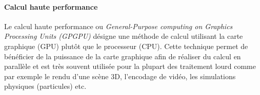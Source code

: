 \paragraph{Calcul haute performance}
Le calcul haute performance ou \emph{General-Purpose computing on Graphics Processing Units (GPGPU)} désigne une méthode de calcul utilisant la carte graphique (GPU) plutôt que le processeur (CPU). Cette technique permet de bénéficier de la puissance de la carte graphique afin de réaliser du calcul en parallèle et est très souvent utilisée pour la plupart des traitement lourd comme par exemple le rendu d'une scène 3D, l'encodage de vidéo, les simulations physiques (particules) etc. 
